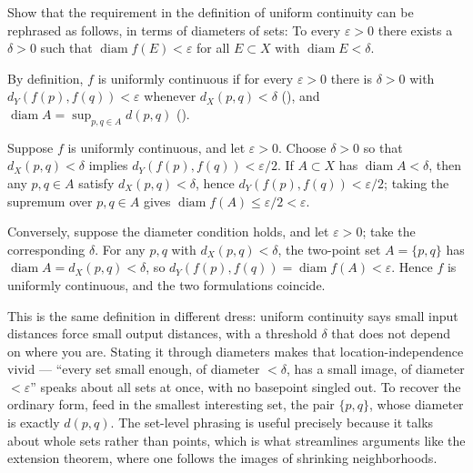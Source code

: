 \documentclass[main.tex]{subfiles}
\begin{document}
Show that the requirement in the definition of uniform continuity can be rephrased as follows, in terms of diameters of sets: To every $\varepsilon > 0$ there exists a $\delta > 0$ such that $\operatorname{diam} f(E) < \varepsilon$ for all $E \subset X$ with $\operatorname{diam} E < \delta$.
\begin{SolutionBlue}
By definition, $f$ is uniformly continuous if for every $\varepsilon > 0$ there is $\delta > 0$ with $d_{Y}(f(p), f(q)) < \varepsilon$ whenever $d_{X}(p, q) < \delta$ (), and $\operatorname{diam} A = \sup_{p, q \in A} d(p, q)$ ().

Suppose $f$ is uniformly continuous, and let $\varepsilon > 0$. Choose $\delta > 0$ so that $d_{X}(p, q) < \delta$ implies $d_{Y}(f(p), f(q)) < \varepsilon/2$. If $A \subset X$ has $\operatorname{diam} A < \delta$, then any $p, q \in A$ satisfy $d_{X}(p, q) < \delta$, hence $d_{Y}(f(p), f(q)) < \varepsilon/2$; taking the supremum over $p, q \in A$ gives $\operatorname{diam} f(A) \le \varepsilon/2 < \varepsilon$.

Conversely, suppose the diameter condition holds, and let $\varepsilon > 0$; take the corresponding $\delta$. For any $p, q$ with $d_{X}(p, q) < \delta$, the two-point set $A = \{p, q\}$ has $\operatorname{diam} A = d_{X}(p, q) < \delta$, so $d_{Y}(f(p), f(q)) = \operatorname{diam} f(A) < \varepsilon$. Hence $f$ is uniformly continuous, and the two formulations coincide.
\end{SolutionBlue}
\begin{Reflection}
This is the same definition in different dress: uniform continuity says small input distances force small output distances, with a threshold $\delta$ that does not depend on where you are. Stating it through diameters makes that location-independence vivid --- ``every set small enough, of diameter $< \delta$, has a small image, of diameter $< \varepsilon$'' speaks about all sets at once, with no basepoint singled out. To recover the ordinary form, feed in the smallest interesting set, the pair $\{p, q\}$, whose diameter is exactly $d(p, q)$. The set-level phrasing is useful precisely because it talks about whole sets rather than points, which is what streamlines arguments like the extension theorem, where one follows the images of shrinking neighborhoods.
\end{Reflection}
\end{document}
